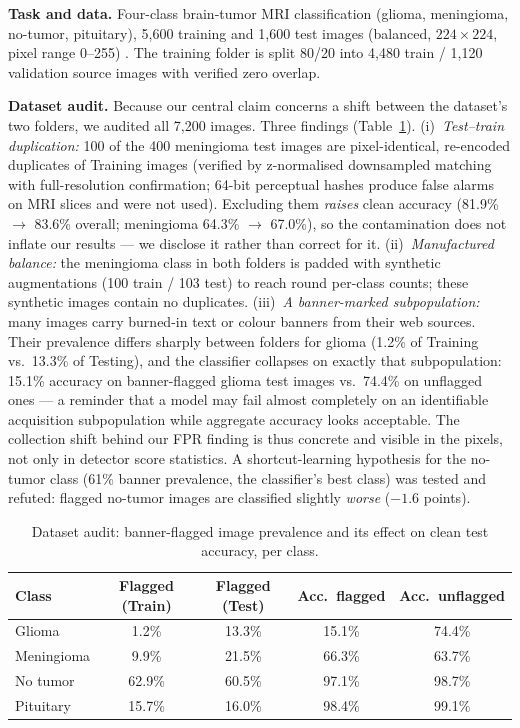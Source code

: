 \documentclass[runningheads]{llncs}
\begin{document}
\textbf{Task and data.} Four-class brain-tumor MRI classification
(glioma, meningioma, no-tumor, pituitary), 5{,}600 training and 1{,}600
test images (balanced, $224\times224$, pixel range 0--255)
\cite{dataset_needs}. The training folder is split 80/20 into 4{,}480
train / 1{,}120 validation source images with verified zero overlap.

\textbf{Dataset audit.} Because our central claim concerns a shift
between the dataset's two folders, we audited all 7{,}200 images. Three
findings (Table~\ref{tab:audit}). (i)~\emph{Test--train duplication:}
100 of the 400 meningioma test images are pixel-identical, re-encoded
duplicates of Training images (verified by z-normalised downsampled
matching with full-resolution confirmation; 64-bit perceptual hashes
produce false alarms on MRI slices and were not used). Excluding them
\emph{raises} clean accuracy (81.9\% $\to$ 83.6\% overall; meningioma
64.3\% $\to$ 67.0\%), so the contamination does not inflate our
results --- we disclose it rather than correct for it.
(ii)~\emph{Manufactured balance:} the meningioma class in both folders
is padded with synthetic augmentations (100 train / 103 test) to reach
round per-class counts; these synthetic images contain no duplicates.
(iii)~\emph{A banner-marked subpopulation:} many images carry burned-in
text or colour banners from their web sources. Their prevalence differs
sharply between folders for glioma (1.2\% of Training vs.\ 13.3\% of
Testing), and the classifier collapses on exactly that subpopulation:
15.1\% accuracy on banner-flagged glioma test images vs.\ 74.4\% on
unflagged ones --- a reminder that a model may fail almost
completely on an identifiable acquisition subpopulation while aggregate
accuracy looks acceptable. The collection shift behind our FPR finding is thus
concrete and visible in the pixels, not only in detector score
statistics. A shortcut-learning hypothesis for the no-tumor class
(61\% banner prevalence, the classifier's best class) was tested and
refuted: flagged no-tumor images are classified slightly \emph{worse}
($-1.6$ points).

\begin{table}
\centering
\caption{Dataset audit: banner-flagged image prevalence and its effect
on clean test accuracy, per class.}
\label{tab:audit}
\begin{tabular}{lcccc}
\toprule
Class & Flagged (Train) & Flagged (Test) & Acc.\ flagged & Acc.\ unflagged \\
\midrule
Glioma     & 1.2\%  & 13.3\% & 15.1\% & 74.4\% \\
Meningioma & 9.9\%  & 21.5\% & 66.3\% & 63.7\% \\
No tumor   & 62.9\% & 60.5\% & 97.1\% & 98.7\% \\
Pituitary  & 15.7\% & 16.0\% & 98.4\% & 99.1\% \\
\bottomrule
\end{tabular}
\end{table}
\end{document}
